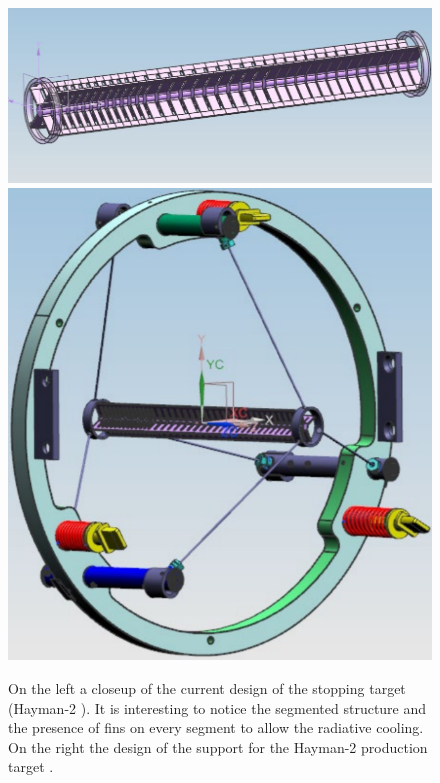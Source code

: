 \documentclass[12pt,a4paper,openright, oneside, titlepage]{book} %
\begin{document}
\begin{figure}[h!]
\centering
\includegraphics[scale=0.45]{Hayman2}\hfill
\includegraphics[scale=0.35]{Hayman2_structure}
\caption[Hayman2 stopping target]{On the left a closeup of the current design of the stopping target (Hayman-2 \cite{Pushka_Hayman2} \cite{bob_Hayman2}). 
It is interesting to notice the segmented structure and the presence of fins on every segment to allow the radiative cooling. 
On the right the design of the support for the Hayman-2 production target \cite{Pushka_Hayman2}.}
\label{_Hayman2}
\end{figure}
\end{document}
